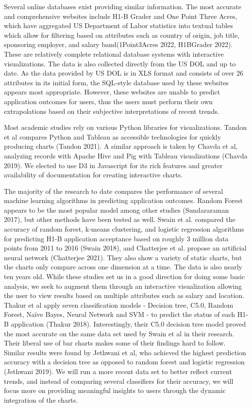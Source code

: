 \documentclass[sigconf]{acmart}
\begin{document}
Several online databases exist providing similar information. The most accurate and comprehensive websites include H1-B Grader and 
One Point Three Acres, which have aggregated US Department of Labor statistics into textual tables which allow for filtering based 
on attributes such as country of origin, job title, sponsoring employer, and salary band(1Point3Acres 2022, H1BGrader 2022). These are relatively complete 
relational database systems with interactive visualizations. The data is also collected directly from the US DOL and up to date. 
As the data provided by US DOL is in XLS format and consists of over 26 attributes in its initial form, the SQL-style database used 
by these websites appears most appropriate. However, these websites are unable to predict application outcomes for users, thus the 
users must perform their own extrapolations based on their subjective interpretations of recent trends.



Most academic studies rely on various Python libraries for visualizations. Tandon et al compares Python and Tableau as accessible technologies 
for quickly producing charts (Tandon 2021). A similar approach is taken by Chavda et al, analyzing records with Apache Hive and Pig with Tableau 
visualizations (Chavda 2019). We elected to use D3 in Javascript for its rich features and greater availability of documentation 
for creating interactive charts. 



The majority of the research to date compares the performance of several machine learning algorithms in predicting application outcomes. 
Random Forest appears to be the most popular model among other studies (Sundararaman 2017), but other methods have been tested as well. 
Swain et al. compared the accuracy of random forest, k-means clustering, and logistic regression algorithms for predicting 
H1-B application acceptance based on roughly 3 million data points from 2011 to 2016 (Swain 2018), and Chatterjee et al. propose an artificial 
neural network (Chatterjee 2021). They also show a variety of static charts, but the charts only compare across one dimension at a time. The data is 
also nearly ten years old. While these studies set us in a good direction for doing some basic analysis, we seek to augment them 
through an interactive visualization allowing the user to view results based on multiple attributes such as salary and location. 
Thakur et al apply seven classification models - Decision tree, C5.0, Random
Forest, Naïve Bayes, Neural Network and SVM - to predict the status of each H1-B application (Thakur 2018). 
Interestingly, their C5.0 decision tree model proved the most accurate on the same data set used by Swain et al in their research. 
Their liberal use of bar charts makes some of their findings hard to follow. Similar results were found by Jethwani et al, who 
achieved the highest prediction accuracy with a decision tree as opposed to random forest and logistic regression (Jethwani 2019). 
We will run a more recent data set to better reflect 
current trends, and instead of comparing several classifiers for their accuracy, we will focus more on providing meaningful insights 
to users through the dynamic integration of the charts.
\end{document}
